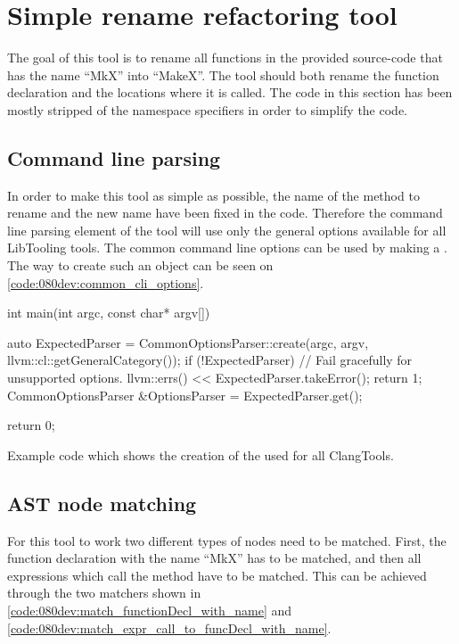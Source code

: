 \section{Simple rename refactoring tool} \label{sec:085tool:example:simple_rename}

The goal of this tool is to rename all functions in the provided source-code that has the name ``MkX'' into ``MakeX''. The tool should both rename the function declaration and the locations where it is called. The code in this section has been mostly stripped of the namespace specifiers in order to simplify the code.

\subsection{Command line parsing}

In order to make this tool as simple as possible, the name of the method to rename and the new name have been fixed in the code. Therefore the command line parsing element of the tool will use only the general options available for all LibTooling tools. The common command line options can be used by making a . The way to create such an object can be seen on \cref{code:080dev:common_cli_options}.

\begin{listing}[H]
    \begin{cppcode}
int main(int argc, const char* argv[]) {
	auto ExpectedParser = CommonOptionsParser::create(argc, argv, llvm::cl::getGeneralCategory());
	if (!ExpectedParser) {
		// Fail gracefully for unsupported options.
		llvm::errs() << ExpectedParser.takeError();
		return 1;
	}
	CommonOptionsParser &OptionsParser = ExpectedParser.get();

    return 0;
}
    \end{cppcode}
    \caption{Example code which shows the creation of the  used for all ClangTools.}
    \label{code:080dev:common_cli_options}
\end{listing}

\subsection{AST node matching}

For this tool to work two different types of nodes need to be matched. First, the function declaration with the name ``MkX'' has to be matched, and then all expressions which call the method have to be matched. This can be achieved through the two matchers shown in \cref{code:080dev:match_functionDecl_with_name} and \cref{code:080dev:match_expr_call_to_funcDecl_with_name}.

